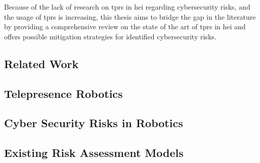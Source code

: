 Because of the lack of research on \ac{tprs} in \ac{hei} regarding cybersecurity risks, and the usage of \ac{tprs}
is increasing, this thesis aims to bridge the gap in the literature by providing a comprehensive review on the state of the art of \ac{
  tprs} in \ac{hei} and offers possible mitigation strategies for identified cybersecurity risks.


\subsection{Related Work}





\subsection{Telepresence Robotics}


\subsection{Cyber Security Risks in Robotics}


\subsection{Existing Risk Assessment Models}

